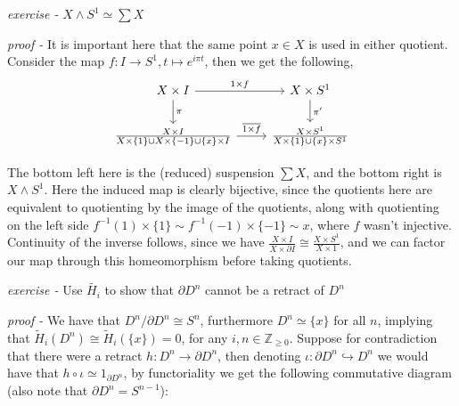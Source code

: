 \documentclass[11pt]{article}
\theoremstyle{definition}
\newcommand{\set}[1]{\{#1\}}
\begin{document}

    \emph{exercise - }\label{HEx9} \(X \wedge S^1 \simeq \sum X\)

    \emph{proof - } It is important here that the same point \(x \in X\) is used in either quotient. Consider the map \(f: I \to S^1, t \mapsto e^{i\pi t}\), then we get the following,
    \begin{equation*}
        \begin{tikzcd}
            X \times I \arrow[d,"{\pi}"] \arrow[r,"{1 \times f}"] & X \times S^1 \arrow[d,"{\pi'}"] \\
            \frac{X \times I}{X \times \set{1} \cup X \times \set{-1} \cup \set{x}\times I} \arrow[r,"{\overline{1 \times f}}"] &\frac{X \times S^1}{X\times \set{1} \cup \set{x} \times S^1}
        \end{tikzcd}
    \end{equation*}

    The bottom left here is the (reduced) suspension \(\sum X\), and the bottom right is \(X \wedge S^1\). Here the induced map is clearly bijective, since the quotients here are equivalent to quotienting by the image of the quotients, along with quotienting on the left side \(f^{-1}(1) \times \set{1} \sim f^{-1}(-1) \times \set{-1} \sim x\), where \(f\) wasn't injective. Continuity of the inverse follows, since we have \(\frac{X \times I}{X \times \partial I} \cong \frac{X \times S^1}{X \times 1}\), and we can factor our map through this homeomorphism before taking quotients.

    \emph{exercise - }\label{HEx10} Use \(\tilde{H_i}\) to show that \(\partial D^n\) cannot be a retract of \(D^n\)

    \emph{proof - } We have that \(D^n/\partial D^n \cong S^n\), furthermore \(D^n \simeq \set{x}\) for all \(n\), implying that \(\tilde{H}_i(D^n) \cong \tilde{H}_i(\set{x}) = 0\), for any \(i,n \in \mathbb{Z}_{\geq 0}\). Suppose for contradiction that there were a retract \(h: D^n \to \partial D^n\), then denoting \(\iota: \partial D^n \hookrightarrow D^n\) we would have that \(h \circ \iota \simeq 1_{\partial D^n}\), by functoriality we get the following commutative diagram (also note that \(\partial D^n = S^{n-1}\)):
\end{document}
